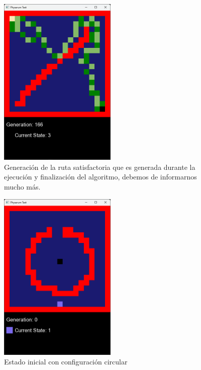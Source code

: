    \vskip 0.5cm
    \begin{figure}[htbp]
        \centering
        \includegraphics[width=0.5\textwidth]{./images/Pruebas/simulador/image069.png}
        \caption{Generaci\'on de la ruta satisfactoria que es generada durante la ejecuci\'on y finalizaci\'on del algoritmo, debemos de informarnos mucho m\'as.}
        \label{fig:Ruta 69}
    \end{figure}
    \vskip 0.5cm
    \begin{figure}[htbp]
        \centering
        \includegraphics[width=0.5\textwidth]{./images/Pruebas/simulador/image071.png}
        \caption{Estado inicial con configuraci\'on circular}
        \label{fig:Ruta 71}
    \end{figure}
